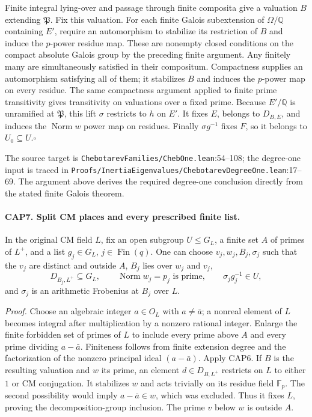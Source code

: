 Finite integral lying-over and passage through finite composita give
a valuation $B$ extending $\mathfrak P$.  Fix this valuation.  For
each finite Galois subextension of $\Omega/\mathbb Q$ containing
$E'$, require an automorphism to stabilize its restriction of $B$
and induce the $p$-power residue map.  These are nonempty closed
conditions on the compact absolute Galois group by the preceding
finite argument.  Any finitely many are simultaneously satisfied
in their compositum.  Compactness supplies an automorphism satisfying
all of them; it stabilizes $B$ and induces the $p$-power map on every
residue.  The same compactness argument applied to finite prime
transitivity gives transitivity on valuations over a fixed prime.
Because $E'/\mathbb Q$ is unramified at $\mathfrak P$, this lift
$\sigma$ restricts to $h$ on $E'$.  It fixes $E$, belongs to
$D_{B,E}$, and induces the $\operatorname{Norm}w$ power map on
residues.  Finally $\sigma g^{-1}$ fixes $F$, so it belongs to
$U_0\subseteq U$.\hfill$\square$

The source target is \nolinkurl{ChebotarevFamilies/ChebOne.lean}:54--108;
the degree-one input is traced in
\nolinkurl{Proofs/InertiaEigenvalues/ChebotarevDegreeOne.lean}:17--69.
The argument above derives the required degree-one conclusion directly
from the stated finite Galois theorem.

\paragraph{CAP7. Split CM places and every prescribed finite list.}
\label{claim:CAP7}
In the original CM field $L$, fix an open subgroup $U\leq G_L$,
a finite set $A$ of primes of $L^+$, and a list
$g_j\in G_L$, $j\in\operatorname{Fin}(q)$.  One can choose
$v_j,w_j,B_j,\sigma_j$ such that the $v_j$ are distinct and outside
$A$, $B_j$ lies over $w_j$ and $v_j$,
\[
 D_{B_j,L^+}\subseteq G_L,
 \qquad \operatorname{Norm}w_j=p_j\text{ is prime},\qquad
 \sigma_jg_j^{-1}\in U,
 \tag{CAP.10}
\]
and $\sigma_j$ is an arithmetic Frobenius at $B_j$ over $L$.

\emph{Proof.}
Choose an algebraic integer $a\in O_L$ with $a\ne\bar a$; a
nonreal element of $L$ becomes integral after multiplication by a
nonzero rational integer.  Enlarge the finite forbidden set of primes
of $L$ to include every prime above $A$ and every prime dividing
$a-\bar a$.  Finiteness follows from finite extension degree and the
factorization of the nonzero principal ideal $(a-\bar a)$.
Apply CAP6.  If $B$ is the resulting valuation and $w$ its prime,
an element $d\in D_{B,L^+}$ restricts on $L$ to either $1$ or CM
conjugation.  It stabilizes $w$ and acts trivially on its residue field
$\mathbb F_p$.  The second possibility would imply
$a-\bar a\in w$, which was excluded.  Thus it fixes $L$, proving
the decomposition-group inclusion.  The prime $v$ below $w$ is
outside $A$.

